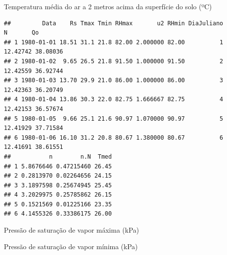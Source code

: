 \documentclass[
]{book}
\newenvironment{Shaded}{\begin{snugshade}}{\end{snugshade}}
\newcommand{\DecValTok}[1]{\textcolor[rgb]{0.00,0.00,0.81}{#1}}
\newcommand{\FloatTok}[1]{\textcolor[rgb]{0.00,0.00,0.81}{#1}}
\newcommand{\KeywordTok}[1]{\textcolor[rgb]{0.13,0.29,0.53}{\textbf{#1}}}
\newcommand{\NormalTok}[1]{#1}
\newcommand{\OperatorTok}[1]{\textcolor[rgb]{0.81,0.36,0.00}{\textbf{#1}}}
\newcommand{\StringTok}[1]{\textcolor[rgb]{0.31,0.60,0.02}{#1}}
\begin{document}
Temperatura média do ar a 2 metros acima da superfície do solo (ºC)

\begin{Shaded}
\end{Shaded}

\begin{verbatim}
##         Data    Rs Tmax Tmin RHmax       u2 RHmin DiaJuliano        N       Qo
## 1 1980-01-01 18.51 31.1 21.8 82.00 2.000000 82.00          1 12.42742 38.08036
## 2 1980-01-02  9.65 26.5 21.8 91.50 1.000000 91.50          2 12.42559 36.92744
## 3 1980-01-03 13.70 29.9 21.0 86.00 1.000000 86.00          3 12.42363 36.20749
## 4 1980-01-04 13.86 30.3 22.0 82.75 1.666667 82.75          4 12.42153 36.57674
## 5 1980-01-05  9.66 25.1 21.6 90.97 1.070000 90.97          5 12.41929 37.71584
## 6 1980-01-06 16.10 31.2 20.8 80.67 1.380000 80.67          6 12.41691 38.61551
##           n        n.N  Tmed
## 1 5.8676646 0.47215460 26.45
## 2 0.2813970 0.02264656 24.15
## 3 3.1897598 0.25674945 25.45
## 4 3.2029975 0.25785862 26.15
## 5 0.1521569 0.01225166 23.35
## 6 4.1455326 0.33386175 26.00
\end{verbatim}

Pressão de saturação de vapor máxima (kPa)

\begin{Shaded}
\end{Shaded}

Pressão de saturação de vapor mínima (kPa)

\begin{Shaded}
\end{Shaded}
\end{document}

